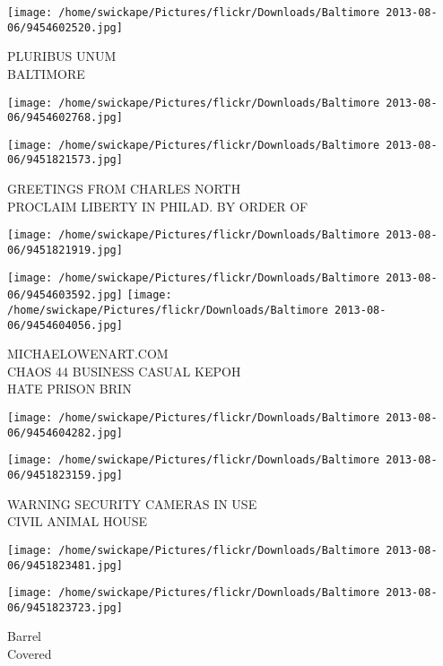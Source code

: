 \documentclass[10pt,letterpaper]{article}
\begin{document}
\vspace{0.25in}
\texttt{[image: /home/swickape/Pictures/flickr/Downloads/Baltimore 2013-08-06/9454602520.jpg]}

PLURIBUS UNUM\\
BALTIMORE\\
\pagebreak

\texttt{[image: /home/swickape/Pictures/flickr/Downloads/Baltimore 2013-08-06/9454602768.jpg]}

\vspace{0.25in}
\texttt{[image: /home/swickape/Pictures/flickr/Downloads/Baltimore 2013-08-06/9451821573.jpg]}

GREETINGS FROM CHARLES NORTH\\
PROCLAIM LIBERTY IN PHILAD. BY ORDER OF\\
\pagebreak

\texttt{[image: /home/swickape/Pictures/flickr/Downloads/Baltimore 2013-08-06/9451821919.jpg]}

\vspace{0.25in}
\texttt{[image: /home/swickape/Pictures/flickr/Downloads/Baltimore 2013-08-06/9454603592.jpg]}
\texttt{[image: /home/swickape/Pictures/flickr/Downloads/Baltimore 2013-08-06/9454604056.jpg]}

MICHAELOWENART.COM\\
CHAOS 44 BUSINESS CASUAL KEPOH\\
HATE PRISON BRIN\\
\pagebreak

\texttt{[image: /home/swickape/Pictures/flickr/Downloads/Baltimore 2013-08-06/9454604282.jpg]}

\vspace{0.25in}
\texttt{[image: /home/swickape/Pictures/flickr/Downloads/Baltimore 2013-08-06/9451823159.jpg]}

WARNING SECURITY CAMERAS IN USE\\
CIVIL ANIMAL HOUSE\\
\pagebreak

\texttt{[image: /home/swickape/Pictures/flickr/Downloads/Baltimore 2013-08-06/9451823481.jpg]}

\vspace{0.25in}
\texttt{[image: /home/swickape/Pictures/flickr/Downloads/Baltimore 2013-08-06/9451823723.jpg]}

Barrel\\
Covered\\
\pagebreak
\end{document}
